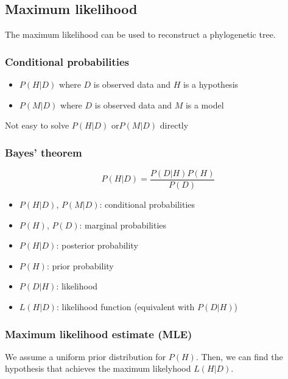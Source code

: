 %
%

%
%
\subsection{Maximum likelihood}
The maximum likelihood can be used to reconstruct a phylogenetic tree.

%
%
\subsubsection*{Conditional probabilities}
\begin{itemize}
\item $P(H|D)$ where $D$ is observed data and $H$ is a hypothesis
\item $P(M|D)$ where $D$ is observed data and $M$ is a model
\end{itemize}

\noindent
Not easy to solve $P(H|D)$ or$ P(M|D)$ directly

%
%
\subsubsection*{Bayes' theorem}
\medskip 

\[
P(H|D) = \dfrac{P(D|H)P(H)}{P(D)}
\]

\begin{itemize}
\item $P(H|D)$, $P(M|D)$: conditional probabilities
\item $P(H)$, $P(D)$: marginal probabilities
\item $P(H|D)$: posterior probability
\item $P(H)$: prior probability
\item $P(D|H)$: likelihood
\item $L(H|D)$: likelihood function (equivalent with $P(D|H)$)
\end{itemize}

%
%
\subsubsection*{Maximum likelihood estimate (MLE)}
We assume a uniform prior distribution for $P(H)$. Then, we can find the hypothesis that achieves the maximum likelyhood $L(H|D)$. \\


